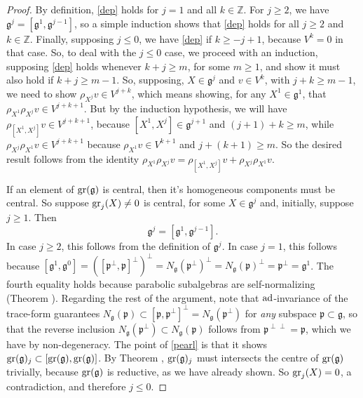 \documentclass[leqno,12pt]{amsart} %
\begin{document}
\begin{proof}
  By definition, \eqref{dep} holds for $j=1$ and all $k \in {\mathbb Z} $. For $j\ge 2 $,
  we have ${\mathfrak g}^j = [{\mathfrak g}^1, {\mathfrak g}^{j-1}]$, so a simple
  induction shows that \eqref{dep} holds for all $j \ge 2$ and $k \in {\mathbb
    Z}$. Finally, supposing $j \le 0$, we have \eqref{dep} if $k \ge - j + 1$, because
  $V^k = 0$ in that case. So, to deal with the $j \le 0$ case, we proceed with an
  induction, supposing \eqref{dep} holds whenever $k + j \ge m$, for some $m \ge 1$, and
  show it must also hold if $k + j \ge m - 1$.  So, supposing, $X \in {\mathfrak g}^j$ and
  $v \in V^k$, with $j + k \ge m - 1$, we need to show $\rho_{X^j}v \in V^{j+k}$, which
  means showing, for any $X^1 \in {\mathfrak g}^1$, that
  $\rho_{X^1}\rho_{X^j}v \in V^{j+k+1}$. But by the induction hypothesis, we will have
  $\rho_{[X^1, X^j]}v \in V^{j+k+1}$, because $[X^1, X^j] \in {\mathfrak g}^{j +1}$ and
  $(j + 1) + k \ge m $, while $\rho_{X^j}\rho_{X^1}v \in V^{j+k+1}$ because
  $\rho_{X^1}v \in V^{k+1}$ and $j + (k+1) \ge m$. So the desired result follows from the
  identity $\rho_{X^1}\rho_{X^j}v = \rho_{[X^1, X^j]}v + \rho_{X^j}\rho_{X^1}v$.

  If an element of $\operatorname{\operatorname{gr}}({\mathfrak g})$ is central, then it's homogeneous components
  must be central. So suppose $\operatorname{\operatorname{gr}}_j(X)\ne 0$ is central, for some
  $X \in {\mathfrak g}^j$ and, initially, suppose $j \ge 1$. Then
  \begin{equation}
    \label{pearl}
    {\mathfrak g}^j = [{\mathfrak g}^1, {\mathfrak g}^{j-1}].
  \end{equation}
  In case $j \ge 2$, this follows from the definition of ${\mathfrak g}^j$. In case
  $j =1$, this follows because
  $[{\mathfrak g}^1, {\mathfrak g}^0] = ([{\mathfrak p}^\perp, {\mathfrak
    p}]^\perp)^\perp=N_{\mathfrak g}({\mathfrak p}^\perp)^\perp = N_{\mathfrak
    g}({\mathfrak p})^\perp={\mathfrak p}^\perp={\mathfrak g}^1$. The fourth equality
  holds because parabolic subalgebras are self-normalizing (Theorem
  ). Regarding the rest of the argument, note that $\operatorname{ad}$-invariance
  of the trace-form guarantees
  $N_{\mathfrak g} ({\mathfrak p}) \subset [{\mathfrak p}, {\mathfrak p}^\perp]^\perp =
  N_{\mathfrak g}({\mathfrak p}^\perp)$ for {\em any} subspace
  ${\mathfrak p} \subset {\mathfrak g}$, so that the reverse inclusion
  $N_{\mathfrak g}({\mathfrak p}^\perp)\subset N_{\mathfrak g} ({\mathfrak p})$ follows
  from ${\mathfrak p}^{\perp \perp}={\mathfrak p}$, which we have by non-degeneracy. The
  point of \eqref{pearl} is that it shows
  $\operatorname{\operatorname{gr}}({\mathfrak g})_j \subset [\operatorname{\operatorname{gr}}({\mathfrak g}), \operatorname{\operatorname{gr}}({\mathfrak g})]$. By
  Theorem , $\operatorname{\operatorname{gr}}({\mathfrak g})_j$ must intersects the centre of
  $\operatorname{\operatorname{gr}}({\mathfrak g})$ trivially, because $\operatorname{\operatorname{gr}}({\mathfrak g})$ is reductive, as we
  have already shown. So $\operatorname{\operatorname{gr}}_j(X)=0$, a contradiction, and therefore $j \le 0$.


\end{proof}
\end{document}
